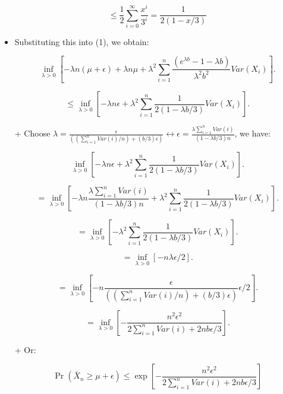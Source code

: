 \begin{itemize}
    \[
    \leq \frac{1}{2}\sum_{i=0}^\infty \frac{x^i}{3^i} = \frac{1}{2(1 - x/3)}
    \]

    \item Substituting this into (1), we obtain:

    \[
    \inf_{\lambda>0} 
    \left[ -\lambda n(\mu + \epsilon) +  \lambda n \mu + \lambda ^ 2 \sum_{i=1}^n\frac{(e^{\lambda b} - 1 - \lambda b)}{\lambda^2 b^2}Var(X_i) \right]. 
    \]

    \[
    \leq \inf_{\lambda>0} 
    \left[ -\lambda n\epsilon + \lambda ^ 2 \sum_{i=1}^n\frac{1}{2(1 - \lambda b/3)} Var(X_i) \right].
    \]

    \item[+] Choose $\lambda = \frac{\epsilon}{((\sum_{i = 1}^{n}Var(i) / n) + (b /3) \epsilon)} \leftrightarrow \epsilon = \frac{\lambda \sum_{i = 1}^{n}Var(i)}{(1 -  \lambda b /3) n}$, we have:

    \[
    \inf_{\lambda>0} 
    \left[ -\lambda n\epsilon + \lambda ^ 2 \sum_{i=1}^n\frac{1}{2(1 - \lambda b/3)} Var(X_i) \right].
    \]

    \[
    = \inf_{\lambda>0} 
    \left[ -\lambda n \frac{\lambda \sum_{i = 1}^{n}Var(i)}{(1 -  \lambda b /3)n} + \lambda ^ 2 \sum_{i=1}^n\frac{1}{2(1 - \lambda b/3)} Var(X_i) \right].
    \]

    \[
    = \inf_{\lambda>0} 
    \left[ - \lambda ^ 2 \sum_{i=1}^n\frac{1}{2(1 - \lambda b/3)} Var(X_i) \right].
    \]

    \[
    = \inf_{\lambda>0} 
    \left[ - n \lambda \epsilon / 2 \right].
    \]

    \[
    = \inf_{\lambda>0} 
    \left[ - n \frac{\epsilon}{((\sum_{i = 1}^{n}Var(i) / n) + (b /3) \epsilon)} \epsilon / 2 \right].
    \]

    \[
    = \inf_{\lambda>0} 
    \left[ -\frac{n ^ 2 \epsilon ^ 2}{2\sum_{i = 1}^{n}Var(i) + 2nb\epsilon /3} \right].
    \]

    \item[+] Or:

    \[
    \Pr(\bar{X}_n \geq \mu + \epsilon) \leq \exp\left[ -\frac{n ^ 2 \epsilon ^ 2}{2\sum_{i = 1}^{n}Var(i) + 2nb\epsilon /3} \right]
    \]
\end{itemize}